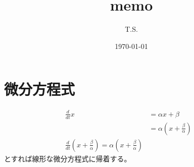 \documentclass[a4paper,11pt]{jsarticle}
\begin{document}
\title{memo}
\author{T.S.}
\date{\today}
\maketitle

\section{微分方程式}
\begin{align}
  \frac{d}{dt} x &= \alpha x +\beta\\
  &= \alpha (x +\frac{\beta}{\alpha})&\\
  \frac{d}{dt} (x+\frac{\beta}{\alpha}) = \alpha (x +\frac{\beta}{\alpha})
\end{align}
とすれば線形な微分方程式に帰着する。
\end{document}
